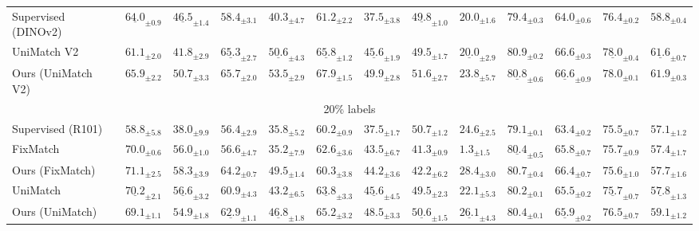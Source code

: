 \documentclass{article}\usepackage[a4paper,landscape,margin=1cm]{geometry}
\begin{document}
\begin{table}[!t]
\begin{tabularx}{\textwidth}{@{}l*{12}{>{\centering\arraybackslash}X}@{}}
\arrayrulecolor[gray]{0.65}\cmidrule[0.3pt]{1-13}\arrayrulecolor{black}
Supervised (DINOv2) & $\underline{64.0}_{\pm0.9}$ & $\underline{46.5}_{\pm1.4}$ & $58.4_{\pm3.1}$ & $40.3_{\pm4.7}$ & $61.2_{\pm2.2}$ & $37.5_{\pm3.8}$ & $\underline{49.8}_{\pm1.0}$ & $20.0_{\pm1.6}$ & $79.4_{\pm0.3}$ & $64.0_{\pm0.6}$ & $76.4_{\pm0.2}$ & $58.8_{\pm0.4}$ \\
UniMatch V2 & $61.1_{\pm2.0}$ & $41.8_{\pm2.9}$ & $\underline{65.3}_{\pm2.7}$ & $\underline{50.6}_{\pm4.3}$ & $\underline{65.8}_{\pm1.2}$ & $\underline{45.6}_{\pm1.9}$ & $49.5_{\pm1.7}$ & $\underline{20.0}_{\pm2.9}$ & $\mathbf{80.9}_{\pm0.2}$ & $\mathbf{66.6}_{\pm0.3}$ & $\underline{78.0}_{\pm0.4}$ & $\underline{61.6}_{\pm0.7}$ \\
Ours (UniMatch V2) & $\mathbf{65.9}_{\pm2.2}$ & $\mathbf{50.7}_{\pm3.3}$ & $\mathbf{65.7}_{\pm2.0}$ & $\mathbf{53.5}_{\pm2.9}$ & $\mathbf{67.9}_{\pm1.5}$ & $\mathbf{49.9}_{\pm2.8}$ & $\mathbf{51.6}_{\pm2.7}$ & $\mathbf{23.8}_{\pm5.7}$ & $\underline{80.8}_{\pm0.6}$ & $\underline{66.6}_{\pm0.9}$ & $\mathbf{78.0}_{\pm0.1}$ & $\mathbf{61.9}_{\pm0.3}$ \\
\midrule
\multicolumn{13}{c}{20\% labels} \\
\cmidrule{1-13}
Supervised (R101) & $58.8_{\pm5.8}$ & $38.0_{\pm9.9}$ & $56.4_{\pm2.9}$ & $35.8_{\pm5.2}$ & $60.2_{\pm0.9}$ & $37.5_{\pm1.7}$ & $\mathbf{50.7}_{\pm1.2}$ & $24.6_{\pm2.5}$ & $79.1_{\pm0.1}$ & $63.4_{\pm0.2}$ & $75.5_{\pm0.7}$ & $57.1_{\pm1.2}$ \\
FixMatch & $70.0_{\pm0.6}$ & $56.0_{\pm1.0}$ & $56.6_{\pm4.7}$ & $35.2_{\pm7.9}$ & $62.6_{\pm3.6}$ & $43.5_{\pm6.7}$ & $41.3_{\pm0.9}$ & $1.3_{\pm1.5}$ & $\underline{80.4}_{\pm0.5}$ & $65.8_{\pm0.7}$ & $75.7_{\pm0.9}$ & $57.4_{\pm1.7}$ \\
Ours (FixMatch) & $\mathbf{71.1}_{\pm2.5}$ & $\mathbf{58.3}_{\pm3.9}$ & $\mathbf{64.2}_{\pm0.7}$ & $\mathbf{49.5}_{\pm1.4}$ & $60.3_{\pm3.8}$ & $44.2_{\pm3.6}$ & $42.2_{\pm6.2}$ & $\mathbf{28.4}_{\pm3.0}$ & $\mathbf{80.7}_{\pm0.4}$ & $\mathbf{66.4}_{\pm0.7}$ & $75.6_{\pm1.0}$ & $57.7_{\pm1.6}$ \\
UniMatch & $\underline{70.2}_{\pm2.1}$ & $\underline{56.6}_{\pm3.2}$ & $60.9_{\pm4.3}$ & $43.2_{\pm6.5}$ & $\underline{63.8}_{\pm3.3}$ & $\underline{45.6}_{\pm4.5}$ & $49.5_{\pm2.3}$ & $22.1_{\pm5.3}$ & $80.2_{\pm0.1}$ & $65.5_{\pm0.2}$ & $\underline{75.7}_{\pm0.7}$ & $\underline{57.8}_{\pm1.3}$ \\
Ours (UniMatch) & $69.1_{\pm1.1}$ & $54.9_{\pm1.8}$ & $\underline{62.9}_{\pm1.1}$ & $\underline{46.8}_{\pm1.8}$ & $\mathbf{65.2}_{\pm3.2}$ & $\mathbf{48.5}_{\pm3.3}$ & $\underline{50.6}_{\pm1.5}$ & $\underline{26.1}_{\pm4.3}$ & $80.4_{\pm0.1}$ & $\underline{65.9}_{\pm0.2}$ & $\mathbf{76.5}_{\pm0.7}$ & $\mathbf{59.1}_{\pm1.2}$ \\

\end{tabularx}
\end{table}
\end{document}
